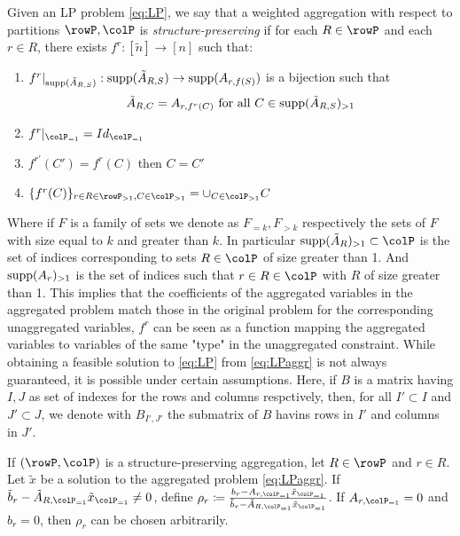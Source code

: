 { \begin{definition}
  Given an LP problem \eqref{eq:LP}, we say that a weighted aggregation with respect to partitions \(\rowP, \colP\) is \emph{structure-preserving} if for each \(R \in \rowP\) and each \(r \in R\), there exists \(f^r: [\tilde{n}] \to [n]\)  such that:
  \begin{enumerate}
    \item \(f^r|_{\operatorname{supp}(\tilde{A}_{R,S})}: \operatorname{supp}(\tilde{A}_{R,S}) \to \operatorname{supp}(A_{r,f(S)})\) is a bijection such that
    \[\tilde{A}_{R,C} = A_{r,f^r(C)} \text{ for all } C \in \operatorname{supp}(\tilde{A}_{R,S})_{>1}\]
    \item \(f^r|_{\colP_{=1}} = Id_{\colP_{=1}}\)
    \item \(f^{r'}(C') = f^r(C)\) then \( C=C'\)
    \item \(\{f^r(C)\}_{r\in R \in \rowP_{>1}, C \in \colP_{>1}} = \cup_{C \in \colP_{>1}}C\)
  \end{enumerate}
  \end{definition}

Where if \(F\) is a family of sets we denote as \(F_{=k}, F_{>k}\) respectively the sets of \(F\) with size equal to \(k\) and greater than \(k\).
In particular \(\supp(\tilde{A}_R)_{>1} \subset \colP\) is the set of indices corresponding to sets \(R \in \colP\) of size greater than 1. And \(\operatorname{supp}(A_r)_{>1}\) is the set of indices such that \(r \in R \in \colP\) with \(R\) of size greater than 1.
This implies that the coefficients of the aggregated variables in the aggregated problem match those in the original problem for the corresponding unaggregated variables, \(f^r\) can be seen as a function mapping the aggregated variables to variables of the same "type" in the unaggregated constraint.
 While obtaining a feasible solution to \eqref{eq:LP} from \eqref{eq:LPaggr} is not always guaranteed, it is possible under certain assumptions.
Here, if \(B\) is a matrix having \(I,J\) as set of indexes for the rows and columns respctively, then, for all \(I' \subset I\) and \(J' \subset J\), we denote with \(B_{I',J'}\) the submatrix of \(B\) havins rows in \(I'\) and columns in \(J'\).
\begin{observation}
\label{ob:aggrconstr}
If \((\rowP, \colP)\) is a structure-preserving aggregation, let \(R \in \rowP\) and \(r \in R\). Let \(\tilde{x}\) be a solution to the aggregated problem \eqref{eq:LPaggr}. If \(\tilde{b}_r - \tilde{A}_{R, \colP_{=1}} \tilde{x}_{\colP_{=1}} \neq 0\), define \(\rho_r \coloneqq \frac{b_r - A_{r, \colP_{=1}} \tilde{x}_{\colP_{=1}}}{\tilde{b}_r
 - \tilde{A}_{R, \colP_{=1}} \tilde{x}_{\colP_{=1}}}\). If \(A_{r, \colP_{=1}} = 0\) and \(b_r = 0\), then \(\rho_r\) can be chosen arbitrarily. 


\end{observation}}
